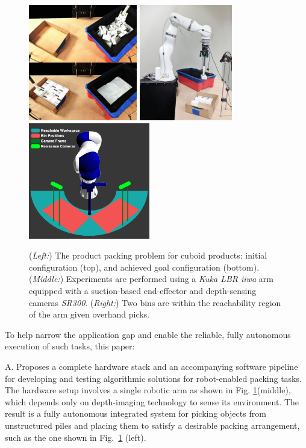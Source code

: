 \begin{figure}[t]
\centering
\includegraphics[height=2in]{Figures/initial_final}
\includegraphics[height=2in]{Figures/robot}
\includegraphics[height=2in]{Figures/workspace}
\caption{(\textit{Left:}) The product packing problem for cuboid products: initial configuration (top), and achieved goal configuration (bottom). (\textit{Middle:}) Experiments are performed using a {\it Kuka LBR iiwa} arm equipped with a suction-based end-effector and depth-sensing cameras {\it SR300}. (\textit{Right:}) Two bins are within the reachability region of the arm given overhand picks.}
\label{fig:new_setup}
\vspace*{-0.1in}
\end{figure}

To help narrow the application gap and enable the reliable, fully autonomous execution of such tasks, this paper:

A. Proposes a complete hardware stack and an accompanying software pipeline for developing and testing algorithmic solutions for robot-enabled packing tasks. The hardware setup involves a single robotic arm as shown in Fig. \ref{fig:new_setup}(middle), which depends only on depth-imaging technology to sense its environment. The result is a fully autonomous integrated system for picking objects from unstructured piles and placing them to satisfy a desirable packing arrangement, such as the one shown in Fig.~\ref{fig:new_setup} (left).

